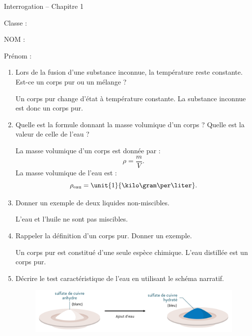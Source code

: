 
\cfoot{} %
\usepackage{setspace}



\begin{header}
Interrogation -- Chapitre 1

\normalsize
\flushleft
\begin{doublespace}
Classe :

NOM :

\end{doublespace}
Prénom :
\end{header}

\begin{enumerate}
\item Lors de la fusion d'une substance inconnue, la température reste constante.
Est-ce un corps pur ou un mélange ?

\textcolor{bleu_f}{Un corps pur change d'état à température constante.
La substance inconnue est donc un corps pur.}
\vfill
\item Quelle est la formule donnant la masse volumique d'un corps ? Quelle est la valeur de celle de l'eau ?

\textcolor{bleu_f}{La masse volumique d'un corps est donnée par :
\begin{equation}
\rho = \frac{m}{V}.
\nonumber
\end{equation}
La masse volumique de l'eau est :
\begin{equation}
\rho_\mathrm{eau} = \unit{1}{\kilo\gram\per\liter}.
\nonumber
\end{equation}
}
\vfill
\item Donner un exemple de deux liquides non-miscibles.

\textcolor{bleu_f}{L'eau et l'huile ne sont pas miscibles.}
\vfill
\item Rappeler la définition d'un corps pur. Donner un exemple.

\textcolor{bleu_f}{Un corps pur est constitué d'une seule espèce chimique. L'eau distillée est un corps pur.}
\vfill
\item Décrire le test caractéristique de l'eau en utilisant le schéma narratif.

\begin{figure}[h]
\center
\includegraphics[scale=0.5]{../images/test_h2o.png}
\end{figure}
\end{enumerate}

